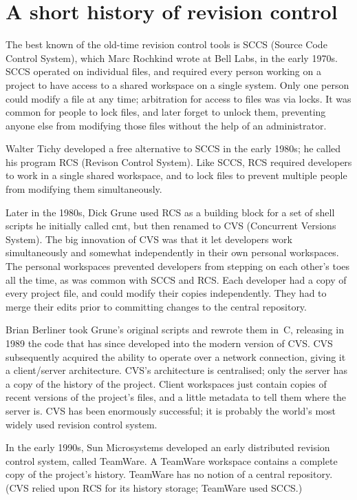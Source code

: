 \section{A short history of revision control}

The best known of the old-time revision control tools is SCCS (Source
Code Control System), which Marc Rochkind wrote at Bell Labs, in the
early 1970s.  SCCS operated on individual files, and required every
person working on a project to have access to a shared workspace on a
single system.  Only one person could modify a file at any time;
arbitration for access to files was via locks.  It was common for
people to lock files, and later forget to unlock them, preventing
anyone else from modifying those files without the help of an
administrator.  

Walter Tichy developed a free alternative to SCCS in the early 1980s;
he called his program RCS (Revison Control System).  Like SCCS, RCS
required developers to work in a single shared workspace, and to lock
files to prevent multiple people from modifying them simultaneously.

Later in the 1980s, Dick Grune used RCS as a building block for a set
of shell scripts he initially called cmt, but then renamed to CVS
(Concurrent Versions System).  The big innovation of CVS was that it
let developers work simultaneously and somewhat independently in their
own personal workspaces.  The personal workspaces prevented developers
from stepping on each other's toes all the time, as was common with
SCCS and RCS.  Each developer had a copy of every project file, and
could modify their copies independently.  They had to merge their
edits prior to committing changes to the central repository.

Brian Berliner took Grune's original scripts and rewrote them in~C,
releasing in 1989 the code that has since developed into the modern
version of CVS.  CVS subsequently acquired the ability to operate over
a network connection, giving it a client/server architecture.  CVS's
architecture is centralised; only the server has a copy of the history
of the project.  Client workspaces just contain copies of recent
versions of the project's files, and a little metadata to tell them
where the server is.  CVS has been enormously successful; it is
probably the world's most widely used revision control system.

In the early 1990s, Sun Microsystems developed an early distributed
revision control system, called TeamWare.  A TeamWare workspace
contains a complete copy of the project's history.  TeamWare has no
notion of a central repository.  (CVS relied upon RCS for its history
storage; TeamWare used SCCS.)

